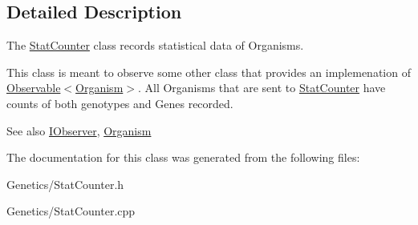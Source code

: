 \subsection{Detailed Description}
The \hyperlink{class_stat_counter}{Stat\+Counter} class records statistical data of Organisms. 

This class is meant to observe some other class that provides an implemenation of \hyperlink{class_observable}{Observable$<$\+Organism$>$}. All Organisms that are sent to \hyperlink{class_stat_counter}{Stat\+Counter} have counts of both genotypes and Genes recorded. \begin{DoxySeeAlso}{See also}
\hyperlink{struct_i_observer}{I\+Observer}, \hyperlink{class_organism}{Organism} 
\end{DoxySeeAlso}


The documentation for this class was generated from the following files\+:\begin{DoxyCompactItemize}
\item 
Genetics/Stat\+Counter.\+h\item 
Genetics/Stat\+Counter.\+cpp\end{DoxyCompactItemize}
